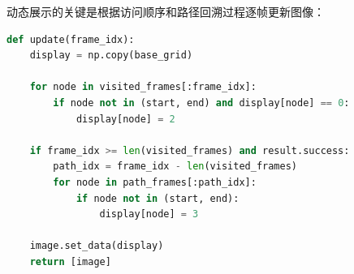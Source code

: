 动态展示的关键是根据访问顺序和路径回溯过程逐帧更新图像：

\begin{lstlisting}[language=Python,basicstyle=\footnotesize\ttfamily,caption={动态展示中的帧更新逻辑},label={code:gif}]
def update(frame_idx):
    display = np.copy(base_grid)

    for node in visited_frames[:frame_idx]:
        if node not in (start, end) and display[node] == 0:
            display[node] = 2

    if frame_idx >= len(visited_frames) and result.success:
        path_idx = frame_idx - len(visited_frames)
        for node in path_frames[:path_idx]:
            if node not in (start, end):
                display[node] = 3

    image.set_data(display)
    return [image]
\end{lstlisting}
